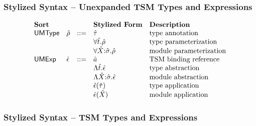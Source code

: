\subsubsection{Stylized Syntax -- Unexpanded TSM Types and Expressions}
\[\begin{array}{lllllll}
\textbf{Sort} & & 
& \textbf{Stylized Form} 
& \textbf{Description}\\
\mathsf{UMType} & \urho & ::= 
& \utau & \text{type annotation}\\
&&
& \alltypes{\ut}{\urho} & \text{type parameterization}\\
&&
& \allmods{\uX}{\usigma}{\urho} & \text{module parameterization}\\
\mathsf{UMExp} & \uepsilon & ::= 
& \tsmv & \text{TSM binding reference}\\
&&
& \abstype{\ut}{\uepsilon} & \text{type abstraction}\\
&&
& \absmod{\uX}{\usigma}{\uepsilon} & \text{module abstraction}\\
&&
& \aptype{\uepsilon}{\utau} & \text{type application}\\
&&
& \apmod{\uepsilon}{\uX} & \text{module application}%
\end{array}
\]

\subsubsection{Stylized Syntax -- TSM Types and Expressions}

